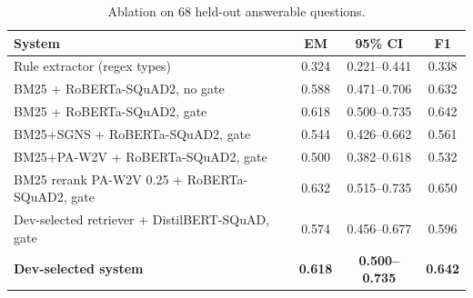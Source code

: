 \begin{table}[H]
\centering
\footnotesize
\caption{Ablation on 68 held-out answerable questions.}
\label{tab:qaablation}
\begin{tabular}{lccc}
\toprule
System & EM & 95\% CI & F1 \\
\midrule
Rule extractor (regex types) & 0.324 & 0.221--0.441 & 0.338 \\
BM25 + RoBERTa-SQuAD2, no gate & 0.588 & 0.471--0.706 & 0.632 \\
BM25 + RoBERTa-SQuAD2, gate & 0.618 & 0.500--0.735 & 0.642 \\
BM25+SGNS + RoBERTa-SQuAD2, gate & 0.544 & 0.426--0.662 & 0.561 \\
BM25+PA-W2V + RoBERTa-SQuAD2, gate & 0.500 & 0.382--0.618 & 0.532 \\
BM25 rerank PA-W2V 0.25 + RoBERTa-SQuAD2, gate & 0.632 & 0.515--0.735 & 0.650 \\
Dev-selected retriever + DistilBERT-SQuAD, gate & 0.574 & 0.456--0.677 & 0.596 \\
\textbf{Dev-selected system} & \textbf{0.618} & \textbf{0.500--0.735} & \textbf{0.642} \\
\bottomrule
\end{tabular}
\end{table}
